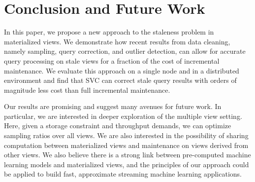 \vspace{-1em}
\section{Conclusion and Future Work}\label{conclusion}
\vspace{-.5em}
In this paper, we propose a new approach to the staleness problem in materialized views.
We demonstrate how recent results from data cleaning, namely sampling, query correction, and outlier detection, can
allow for accurate query processing on stale views for a fraction of the cost of incremental maintenance. 
We evaluate this approach on a single node and in a distributed environment and find that SVC can correct stale query results 
with orders of magnitude less cost than full incremental maintenance.

Our results are promising and suggest many avenues for future work.
In particular, we are interested in deeper exploration of the multiple view setting.
Here, given a storage constraint and throughput demands, we can optimize sampling ratios over all views.
We are also interested in the possibility of sharing computation between materialized views and maintenance on views derived from other views.
We also believe there is a strong link between pre-computed machine learning models and materialized views, and the principles of our approach could be applied to build fast, approximate streaming machine learning applications.




